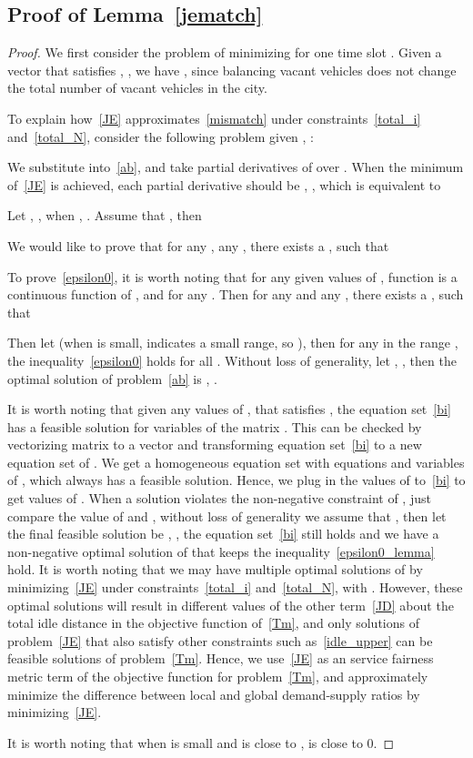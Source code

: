 \documentclass[10pt,twocolumn,twoside,english]{IEEEtran}
\begin{document}
\subsection{Proof of Lemma~\ref{jematch}}
\label{appendix_probform}
\begin{proof}
We first consider the problem of minimizing  for one time slot . 
Given a vector  that satisfies , , we have , since balancing vacant vehicles does not change the total number of vacant vehicles in the city. 
 
To explain how~\eqref{JE} approximates~\eqref{mismatch} under constraints~\eqref{total_i} and~\eqref{total_N}, consider the following problem given , :

We substitute  into~\eqref{ab}, and take partial derivatives of  over . When the minimum of~\eqref{JE} is achieved, each partial derivative should be , , which is equivalent to 


Let , , when , . Assume that , then

We would like to prove that for any ,  any , there exists a , such that


To prove~\eqref{epsilon0}, it is worth noting that for any given values of , function  is a continuous function of , and  for any . Then for any  and any , there exists a , such that
 


Then let  (when  is small,  indicates a small range, so ), then for any  in the range , the inequality~\eqref{epsilon0} holds for all . Without loss of generality, let , , then the optimal solution of problem~\eqref{ab} is , .

It is worth noting that given any values of ,  that satisfies , the equation set~\eqref{bi} has a feasible solution for  variables of the matrix . This can be checked by vectorizing matrix  to a vector  and transforming equation set~\eqref{bi} to a new equation set of . We get a homogeneous equation set with  equations and  variables of , which always has a feasible solution. Hence, we plug in the values of  to~\eqref{bi} to get values of . When a solution violates the non-negative constraint of , just compare the value of  and , without loss of generality we assume that , then let the final feasible solution be , , the equation set~\eqref{bi} still holds and we have a non-negative optimal solution of  that keeps the inequality~\eqref{epsilon0_lemma} hold. It is worth noting that we may have multiple optimal solutions of  by minimizing~\eqref{JE} under constraints~\eqref{total_i} and~\eqref{total_N}, with . However, these optimal solutions will result in different values of the other term~\eqref{JD} about the total idle distance in the objective function of~\eqref{Tm}, and only solutions of problem~\eqref{JE} that also satisfy other constraints such as~\eqref{idle_upper} can be feasible solutions of problem~\eqref{Tm}. Hence, we use~\eqref{JE} as an service fairness metric term of the objective function for problem~\eqref{Tm}, and approximately minimize the difference between local and global demand-supply ratios by minimizing~\eqref{JE}.


It is worth noting that when  is small and  is close to ,  is close to 0.
\end{proof}
\end{document}
